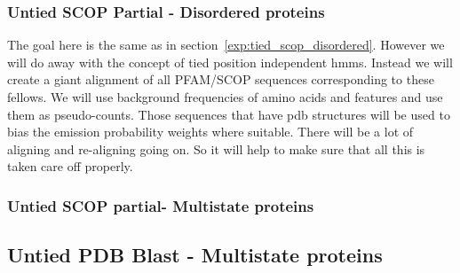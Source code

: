 \documentclass{article}
\begin{document}
\subsubsection{Untied SCOP Partial - Disordered proteins}
\label{exp:untied_scop_disordered}
The goal here is the same as in section~\ref{exp:tied_scop_disordered}. However we will do away with the concept of tied position independent hmms. Instead we will create a giant alignment of all PFAM/SCOP sequences corresponding to these fellows. We will use background frequencies of amino acids and features and use them as pseudo-counts. Those sequences that have pdb structures will be used to bias the emission probability weights where suitable. There will be a lot of aligning and re-aligning going on. So it will help to make sure that all this is taken care off properly.




\subsubsection{Untied SCOP partial- Multistate proteins}


\subsection{Untied PDB Blast - Multistate proteins}



\end{document}
